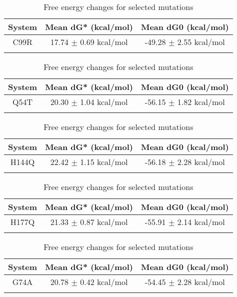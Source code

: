 \documentclass{article}
\begin{document}
\begin{table}[ht]
    \centering
    \begin{tabular}{|c|c|c|}
    \hline
    System & Mean dG* (kcal/mol) & Mean dG0 (kcal/mol) \\
    \hline
        C99R & 17.74 $\pm$ 0.69 kcal/mol & -49.28 $\pm$ 2.55 kcal/mol \\ \\
    \hline
    \end{tabular}
    \caption{Free energy changes for selected mutations}
\end{table}
\begin{table}[ht]
    \centering
    \begin{tabular}{|c|c|c|}
    \hline
    System & Mean dG* (kcal/mol) & Mean dG0 (kcal/mol) \\
    \hline
        Q54T & 20.30 $\pm$ 1.04 kcal/mol & -56.15 $\pm$ 1.82 kcal/mol \\ \\
    \hline
    \end{tabular}
    \caption{Free energy changes for selected mutations}
\end{table}
\begin{table}[ht]
    \centering
    \begin{tabular}{|c|c|c|}
    \hline
    System & Mean dG* (kcal/mol) & Mean dG0 (kcal/mol) \\
    \hline
        H144Q & 22.42 $\pm$ 1.15 kcal/mol & -56.18 $\pm$ 2.28 kcal/mol \\ \\
    \hline
    \end{tabular}
    \caption{Free energy changes for selected mutations}
\end{table}
\begin{table}[ht]
    \centering
    \begin{tabular}{|c|c|c|}
    \hline
    System & Mean dG* (kcal/mol) & Mean dG0 (kcal/mol) \\
    \hline
        H177Q & 21.33 $\pm$ 0.87 kcal/mol & -55.91 $\pm$ 2.14 kcal/mol \\ \\
    \hline
    \end{tabular}
    \caption{Free energy changes for selected mutations}
\end{table}
\begin{table}[ht]
    \centering
    \begin{tabular}{|c|c|c|}
    \hline
    System & Mean dG* (kcal/mol) & Mean dG0 (kcal/mol) \\
    \hline
        G74A & 20.78 $\pm$ 0.42 kcal/mol & -54.45 $\pm$ 2.28 kcal/mol \\ \\
    \hline
    \end{tabular}
    \caption{Free energy changes for selected mutations}
\end{table}
\end{document}
